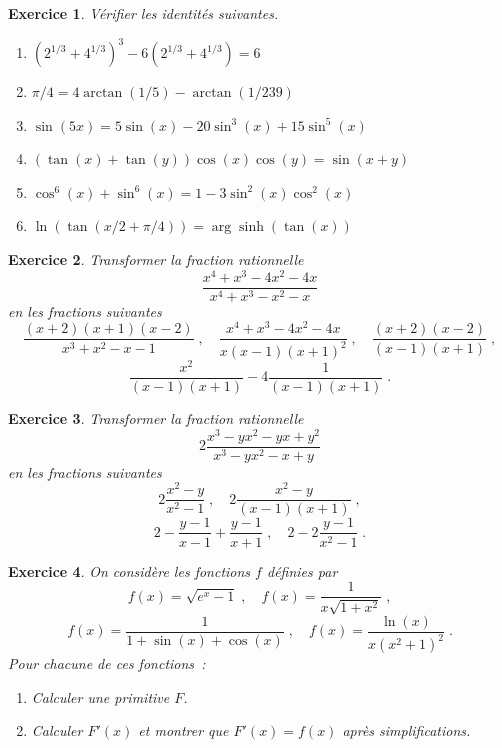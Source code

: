 \documentclass{article}
\newtheorem{exo}{Exercice}[section]
\begin{document}
\begin{exo}{\rm
V\'erifier les identit\'es suivantes.
\begin{enumerate}
\item
$(2^{1/3}+4^{1/3})^3-6(2^{1/3}+4^{1/3})=6$
\item
$\pi /4 = 4\arctan(1/5)-\arctan(1/239)$
\item
$\sin(5x) = 5\sin(x)-20\sin^3(x)+15\sin^5(x)$
\item
$(\tan(x)+\tan(y))\cos(x)\cos(y) = \sin(x+y)$
\item
  $\cos^6(x)+\sin^6(x) = 1-3\sin^2(x)\cos^2(x)$
\item
$\ln(\tan(x/2+\pi/4)) = \arg\sinh(\tan(x))$
\end{enumerate}
}\end{exo}
\begin{exo}{\rm
Transformer la fraction rationnelle
$$
\frac{x^4+x^3-4x^2-4x}{x^4+x^3-x^2-x}
$$
en les fractions suivantes
$$
\frac{(x+2)(x+1)(x-2)}{x^3+x^2-x-1}
\;,\quad
\frac{x^4+x^3-4x^2-4x}{x(x-1)(x+1)^2}
\;,\quad
\frac{(x+2)(x-2)}{(x-1)(x+1)}\;,
$$
$$
\frac{x^2}{(x-1)(x+1)}-4\frac{1}{(x-1)(x+1)}\;.
$$
}\end{exo}
\begin{exo}{\rm
Transformer la fraction rationnelle
$$
2\frac{x^3-yx^2-yx+y^2}{x^3-yx^2-x+y}
$$
en les fractions suivantes
$$
2\frac{x^2-y}{x^2-1}
\;,\quad
2\frac{x^2-y}{(x-1)(x+1)}
\;,
$$
$$
2-\frac{y-1}{x-1}+\frac{y-1}{x+1}
\;,\quad
2-2\frac{y-1}{x^2-1}\;.
$$
}\end{exo}
\begin{exo}{\rm
On consid\`ere les fonctions $f$ d\'efinies par
$$
f(x) = \sqrt{e^x-1}
\;,\quad
f(x) = \frac{1}{x\sqrt{1+x^2}}
\;,
$$
$$
f(x) = \frac{1}{1+\sin(x)+\cos(x)}
\;,\quad
f(x) = \frac{\ln(x)}{x(x^2+1)^2}
 \;.
$$
Pour chacune de ces fonctions~:
\begin{enumerate}
\item
Calculer une primitive $F$.
\item
Calculer $F'(x)$ et montrer que $F'(x)=f(x)$ apr\`es simplifications.
\end{enumerate}
}\end{exo}
\end{document}
